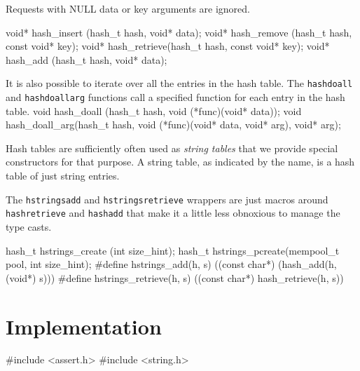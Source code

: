 Requests with NULL data or key arguments are ignored.

\nwenddocs{}\plusendmoddef
void* hash_insert  (hash_t hash, void* data);
void* hash_remove  (hash_t hash, const void* key);
void* hash_retrieve(hash_t hash, const void* key);
void* hash_add     (hash_t hash, void* data);

\nwendcode{}\nwdocspar

It is also possible to iterate over all the entries in the hash
table.  The {\tt{}hash{}doall} and {\tt{}hash{}doall{}arg} functions call
a specified function for each entry in the hash table.
\nwenddocs{}\plusendmoddef
void hash_doall    (hash_t hash, void (*func)(void* data));
void hash_doall_arg(hash_t hash, void (*func)(void* data, void* arg),
                    void* arg);

\nwendcode{}\nwdocspar

Hash tables are sufficiently often used as \emph{string tables}
that we provide special constructors for that purpose.  A
string table, as indicated by the name, is a hash table of just
string entries.

The {\tt{}hstrings{}add} and {\tt{}hstrings{}retrieve} wrappers are just
macros around {\tt{}hash{}retrieve} and {\tt{}hash{}add} that make it a
little less obnoxious to manage the type casts.

\nwenddocs{}\plusendmoddef
hash_t  hstrings_create (int size_hint);
hash_t  hstrings_pcreate(mempool_t pool, int size_hint);
#define hstrings_add(h, s)      ((const char*) (hash_add(h, (void*) s)))
#define hstrings_retrieve(h, s) ((const char*) hash_retrieve(h, s))
\nwendcode{}\nwdocspar


\section{Implementation}

\nwenddocs{}\endmoddef
#include <assert.h>
#include <string.h>

